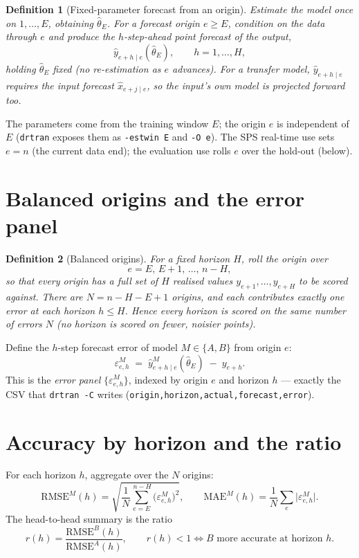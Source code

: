 \documentclass[11pt]{article}
\newtheorem{definition}{Definition}
\begin{document}
\begin{definition}[Fixed-parameter forecast from an origin]
Estimate the model once on $1,\dots,E$, obtaining $\hat\theta_E$. For a
\emph{forecast origin} $e\ge E$, condition on the data through $e$ and produce the
$h$-step-ahead point forecast of the output,
\[
\hat y_{e+h\mid e}(\hat\theta_E), \qquad h=1,\dots,H,
\]
holding $\hat\theta_E$ \emph{fixed} (no re-estimation as $e$ advances). For a
transfer model, $\hat y_{e+h\mid e}$ requires the input forecast
$\hat x_{e+j\mid e}$, so the input's own model is projected forward too.
\end{definition}

The parameters come from the training window $E$; the origin $e$ is independent of
$E$ (\texttt{drtran} exposes them as \texttt{-estwin E} and \texttt{-O e}). The SPS
real-time use sets $e=n$ (the current data end); the evaluation use rolls $e$ over
the hold-out (below).

\section{Balanced origins and the error panel}

\begin{definition}[Balanced origins]
For a fixed horizon $H$, roll the origin over
\[
e = E,\,E+1,\,\dots,\,n-H,
\]
so that \emph{every} origin has a full set of $H$ realised values
$y_{e+1},\dots,y_{e+H}$ to be scored against. There are $N=n-H-E+1$ origins, and
each contributes exactly one error at each horizon $h\le H$. Hence every horizon is
scored on the same number of errors $N$ (no horizon is scored on fewer, noisier
points).
\end{definition}

Define the $h$-step forecast error of model $M\in\{A,B\}$ from origin $e$:
\[
\varepsilon^{M}_{e,h} \;=\; \hat y^{M}_{e+h\mid e}(\hat\theta_E) \;-\; y_{e+h}.
\]
This is the \emph{error panel} $\{\varepsilon^M_{e,h}\}$, indexed by origin $e$ and
horizon $h$ --- exactly the CSV that \texttt{drtran -C} writes
(\texttt{origin,horizon,actual,forecast,error}).

\section{Accuracy by horizon and the ratio}

For each horizon $h$, aggregate over the $N$ origins:
\[
\mathrm{RMSE}^{M}(h)=\sqrt{\frac1N\sum_{e=E}^{\,n-H}\!\big(\varepsilon^{M}_{e,h}\big)^2},
\qquad
\mathrm{MAE}^{M}(h)=\frac1N\sum_{e}\big|\varepsilon^{M}_{e,h}\big|.
\]
The head-to-head summary is the ratio
\[
r(h)=\frac{\mathrm{RMSE}^{B}(h)}{\mathrm{RMSE}^{A}(h)},
\qquad r(h)<1 \iff B \text{ more accurate at horizon } h.
\]
\end{document}
